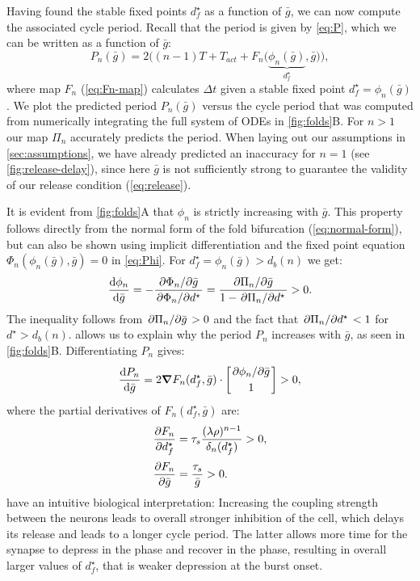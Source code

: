 Having found the stable fixed points \(d^\star_f\) as a function of \(\bar g\), we can now compute the associated cycle period.
Recall that the period is given by \cref{eq:P}, which we can be written as a function of \(\bar g\):
\begin{equation}
	\label{eq:period}
	P_n(\bar g) = 2 \Big(
	(n-1)T + T_{act} + F_n\big(\underbrace{\phi_n(\bar g)}_{d^\star_f}, \bar g\big)
	\Big),
\end{equation}
where map \(F_n\) (\cref{eq:Fn-map}) calculates \(\Delta t\) given a stable fixed point \(d^\star_f=\phi_n(\bar g)\).
We plot the predicted period \(P_n(\bar g)\) versus the cycle period that was computed from numerically integrating the full system of ODEs in \cref{fig:folds}B.
For \(n>1\) our map \(\Pi_n\) accurately predicts the period.
When laying out our assumptions in \cref{sec:assumptions}, we have already predicted an inaccuracy for \(n=1\) (see \cref{fig:release-delay}), since here \(\bar g\) is not sufficiently strong to guarantee the validity of our release condition
(\cref{eq:release}).

It is evident from \cref{fig:folds}A that \(\phi_n\) is strictly increasing with \(\bar g\).
This property follows directly from the normal form of the fold bifurcation (\cref{eq:normal-form}), but can also be shown using implicit differentiation and the fixed point equation \(\Phi_n(\phi_n(\bar g), \bar g)=0\) in \cref{eq:Phi}.
For \(d^\star_f=\phi_n(\bar g)>d_b(n)\) we get:
\begin{equation}
	\label{dstardg:eq}
	\dv{\phi_n}{\bar g} = -\frac{\pdv*{\Phi_n}{\bar g}}{\pdv*{\Phi_n}{d^\star}} =
	\frac{\pdv*{\Pi_n}{\bar g}}{1-\pdv*{\Pi_n}{d^\star}}>0.
\end{equation}
The inequality follows from \(\pdv*{\Pi_n}{\bar g}>0\) and the fact that \(\pdv*{\Pi_n}{d^\star}<1\) for \(d^\star>d_b(n)\).
 allows us to explain why the period \(P_n\) increases with \(\bar g\), as seen in \cref{fig:folds}B.
Differentiating \(P_n\) gives:
\begin{equation}
	\label{eq:dPdg}
	\dv{P_{n}}{\bar g} = 2\grad F_n(d^\star_f, \bar g) \cdot
	\begin{bmatrix}\pdv*{\phi_n}{\bar g}\\[0.5ex] 1\end{bmatrix}>0,
\end{equation}
where the partial derivatives of \(F_n(d^\star_f, \bar g)\) are:
\begin{align}
	\pdv{F_n}{d^\star_f} & = \tau_s \frac{(\lambda\rho)^{n-1}}{\delta_n(d^\star_f)}>0, \\[0.5ex]
	\pdv{F_n}{\bar g}    & = \frac{\tau_s}{\bar g}>0.
\end{align}
 have an intuitive biological interpretation: Increasing the coupling strength between the neurons leads to overall stronger inhibition of the \quiet{} cell, which delays its release and leads to a longer cycle period.
The latter allows more time for the synapse to depress in the \free{} phase and recover in the \quiet{} phase, resulting in overall larger values of \(d^\star_f\), that is weaker depression at the burst onset.

